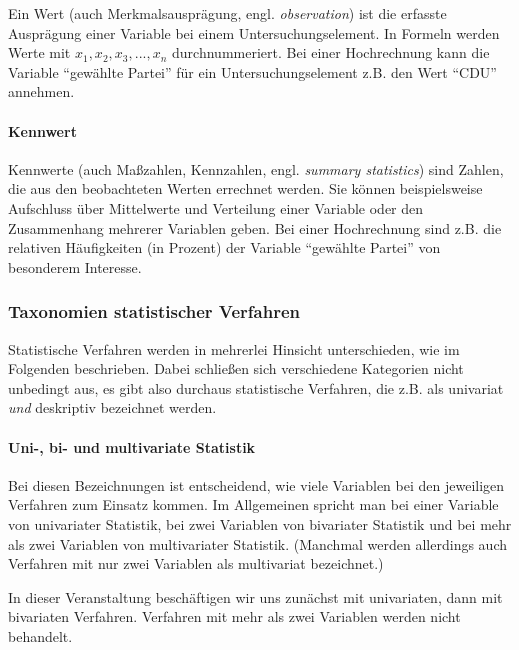 \documentclass[
  ngerman,
]{article}
\begin{document}
Ein Wert (auch Merkmalsausprägung, engl. \emph{observation}) ist die erfasste Ausprägung einer Variable bei einem Untersuchungselement. In Formeln werden Werte mit \(x_1, x_2, x_3, ..., x_n\) durchnummeriert. Bei einer Hochrechnung kann die Variable ``gewählte Partei'' für ein Untersuchungselement z.B. den Wert ``CDU'' annehmen.

\hypertarget{kennwert}{%
\paragraph{Kennwert}\label{kennwert}}

Kennwerte (auch Maßzahlen, Kennzahlen, engl. \emph{summary statistics}) sind Zahlen, die aus den beobachteten Werten errechnet werden. Sie können beispielsweise Aufschluss über Mittelwerte und Verteilung einer Variable oder den Zusammenhang mehrerer Variablen geben. Bei einer Hochrechnung sind z.B. die relativen Häufigkeiten (in Prozent) der Variable ``gewählte Partei'' von besonderem Interesse.

\hypertarget{taxonomien-statistischer-verfahren}{%
\subsubsection{Taxonomien statistischer Verfahren}\label{taxonomien-statistischer-verfahren}}

Statistische Verfahren werden in mehrerlei Hinsicht unterschieden, wie im Folgenden beschrieben. Dabei schließen sich verschiedene Kategorien nicht unbedingt aus, es gibt also durchaus statistische Verfahren, die z.B. als univariat \emph{und} deskriptiv bezeichnet werden.

\hypertarget{uni--bi--und-multivariate-statistik}{%
\paragraph{Uni-, bi- und multivariate Statistik}\label{uni--bi--und-multivariate-statistik}}

Bei diesen Bezeichnungen ist entscheidend, wie viele Variablen bei den jeweiligen Verfahren zum Einsatz kommen. Im Allgemeinen spricht man bei einer Variable von univariater Statistik, bei zwei Variablen von bivariater Statistik und bei mehr als zwei Variablen von multivariater Statistik. (Manchmal werden allerdings auch Verfahren mit nur zwei Variablen als multivariat bezeichnet.)

In dieser Veranstaltung beschäftigen wir uns zunächst mit univariaten, dann mit bivariaten Verfahren. Verfahren mit mehr als zwei Variablen werden nicht behandelt.
\end{document}
